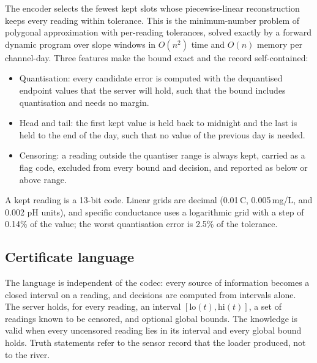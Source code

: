 The encoder selects the fewest kept slots whose piecewise-linear reconstruction keeps every reading within tolerance. This is the minimum-number problem of polygonal approximation \citep{imai1988} with per-reading tolerances, solved exactly by a forward dynamic program over slope windows \citep{orourke1981} in $O(n^2)$ time and $O(n)$ memory per channel-day. Three features make the bound exact and the record self-contained:
\begin{itemize}
  \item Quantisation: every candidate error is computed with the dequantised endpoint values that the server will hold, such that the bound includes quantisation and needs no margin.
  \item Head and tail: the first kept value is held back to midnight and the last is held to the end of the day, such that no value of the previous day is needed.
  \item Censoring: a reading outside the quantiser range is always kept, carried as a flag code, excluded from every bound and decision, and reported as below or above range.
\end{itemize}
A kept reading is a 13-bit code. Linear grids are decimal (0.01\,\textdegree C, 0.005\,mg/L, and 0.002 pH units), and specific conductance uses a logarithmic grid with a step of 0.14\% of the value; the worst quantisation error is 2.5\% of the tolerance.

\subsection{Certificate language}
\label{sec:cert}
The language is independent of the codec: every source of information becomes a closed interval on a reading, and decisions are computed from intervals alone. The server holds, for every reading, an interval $[\mathrm{lo}(t), \mathrm{hi}(t)]$, a set of readings known to be censored, and optional global bounds. The knowledge is valid when every uncensored reading lies in its interval and every global bound holds. Truth statements refer to the sensor record that the loader produced, not to the river.

